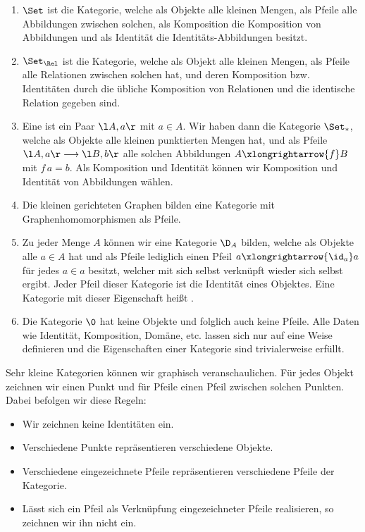 \begin{example}
\begin{enumerate}
\item $\Set$ ist die Kategorie, welche als Objekte alle kleinen Mengen, als Pfeile alle Abbildungen zwischen solchen, als Komposition die Komposition von Abbildungen und als Identität die Identitäts-Abbildungen besitzt.
\item $\Set_\Rel$ ist die Kategorie, welche als Objekt alle kleinen Mengen, als Pfeile alle Relationen zwischen solchen hat, und deren Komposition bzw. Identitäten durch die übliche Komposition von Relationen und die identische Relation gegeben sind.
\item Eine  ist ein Paar $\l A,a\r$ mit $a\in A$. Wir haben dann die Kategorie $\Set_\ast$, welche als Objekte alle kleinen punktierten Mengen hat, und als Pfeile $\l A,a\r\longrightarrow\l B,b\r$ alle solchen Abbildungen $A\xlongrightarrow{f}B$ mit $f\, a=b$. Als Komposition und Identität können wir Komposition und Identität von Abbildungen wählen.
\item Die kleinen gerichteten Graphen bilden eine Kategorie  mit Graphenhomomorphismen als Pfeile.
\item Zu jeder Menge $A$ können wir eine Kategorie $\D_A$ bilden, welche als Objekte alle $a\in A$ hat und als Pfeile lediglich einen Pfeil $a\xlongrightarrow{\id_a}a$ für jedes $a\in a$ besitzt, welcher mit sich selbst verknüpft wieder sich selbst ergibt. Jeder Pfeil dieser Kategorie ist die Identität eines Objektes. Eine Kategorie mit dieser Eigenschaft heißt .
\item Die Kategorie $\0$ hat keine Objekte und folglich auch keine Pfeile. Alle Daten wie Identität, Komposition, Domäne, etc. lassen sich nur auf eine Weise definieren und die Eigenschaften einer Kategorie sind trivialerweise erfüllt.
\end{enumerate}
\end{example}

Sehr kleine Kategorien können wir graphisch veranschaulichen. Für jedes Objekt zeichnen wir einen Punkt und für Pfeile einen Pfeil zwischen solchen Punkten. Dabei befolgen wir diese Regeln:
\begin{itemize}
\item Wir zeichnen keine Identitäten ein.
\item Verschiedene Punkte repräsentieren verschiedene Objekte.
\item Verschiedene eingezeichnete Pfeile repräsentieren verschiedene Pfeile der Kategorie.
\item Lässt sich ein Pfeil als Verknüpfung eingezeichneter Pfeile realisieren, so zeichnen wir ihn nicht ein.
\end{itemize}

